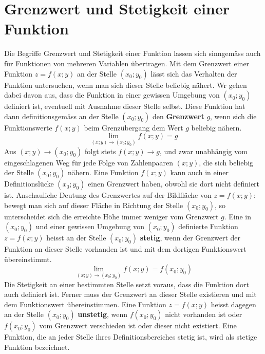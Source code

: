 \section{Grenzwert und Stetigkeit einer Funktion}
Die Begriffe Grenzwert und Stetigkeit einer Funktion lassen sich sinngemäss auch für Funktionen von mehreren Variablen übertragen. Mit dem Grenzwert einer Funktion $z=f\left(x; y\right)$ an der Stelle $\left(x_0; y_0\right)$ lässt sich das Verhalten der Funktion untersuchen, wenn man sich dieser Stelle beliebig nähert. Wr gehen dabei davon aus, dass die Funktion in einer gewissen Umgebung von $\left(x_0; y_0\right)$ definiert ist, eventuell mit Ausnahme dieser Stelle selbst. Diese Funktion hat dann definitionsgemäss an der Stelle $\left(x_0; y_0\right)$ den \textbf{Grenzwert} $g$, wenn sich die Funktionswerte $f\left(x; y\right)$ beim Grenzübergang dem Wert $g$ beliebig nähern.
\begin{equation}
\boxed{\displaystyle \lim_{\left(x; y\right)\rightarrow \left(x_0; y_0\right)}f\left(x; y\right)=g}
\end{equation}
Aus $\left(x; y\right)\rightarrow \left(x_0; y_0\right)$ folgt stets $f\left(x; y\right)\rightarrow g$, und zwar unabhängig vom eingeschlagenen Weg für jede Folge von Zahlenpaaren $\left(x; y\right)$, die sich beliebig der Stelle $\left(x_0; y_0\right)$ nähern. Eine Funktion $f\left(x; y\right)$ kann auch in einer Definitionslücke $\left(x_0; y_0\right)$ einen Grenzwert haben, obwohl sie dort nicht definiert ist. Anschauliche Deutung des Grenzwertes auf der Bildfläche von $z=f\left(x; y\right)$: bewegt man sich auf dieser Fläche in Richtung der Stelle $\left(x_0; y_0\right)$, so unterscheidet sich die erreichte Höhe immer weniger vom Grenzwert $g$.
\newline\newline
Eine in $\left(x_0; y_0\right)$ und einer gewissen Umgebung von $\left(x_0; y_0\right)$ definierte Funktion $z=f\left(x; y\right)$ heisst an der Stelle $\left(x_0; y_0\right)$ \textbf{stetig}, wenn der Grenzwert der Funktion an dieser Stelle vorhanden ist und mit dem dortigen Funktionswert übereinstimmt.
\begin{equation}
\boxed{\displaystyle \lim_{\left(x; y\right)\rightarrow \left(x_0; y_0\right)}f\left(x; y\right)=f\left(x_0; y_0\right)}
\end{equation}
Die Stetigkeit an einer bestimmten Stelle setzt voraus, dass die Funktion dort auch definiert ist. Ferner muss der Grenzwert an dieser Stelle existieren und mit dem Funktionswert übereinstimmen. Eine Funktion $z=f\left(x; y\right)$ heisst dagegen an der Stelle $\left(x_0; y_0\right)$ \textbf{unstetig}, wenn $f\left(x_0; y_0\right)$ nicht vorhanden ist oder $f\left(x_0; y_0\right)$ vom Grenzwert verschieden ist oder dieser nicht existiert. Eine Funktion, die an jeder Stelle ihres Definitionsbereiches stetig ist, wird als stetige Funktion bezeichnet.  
